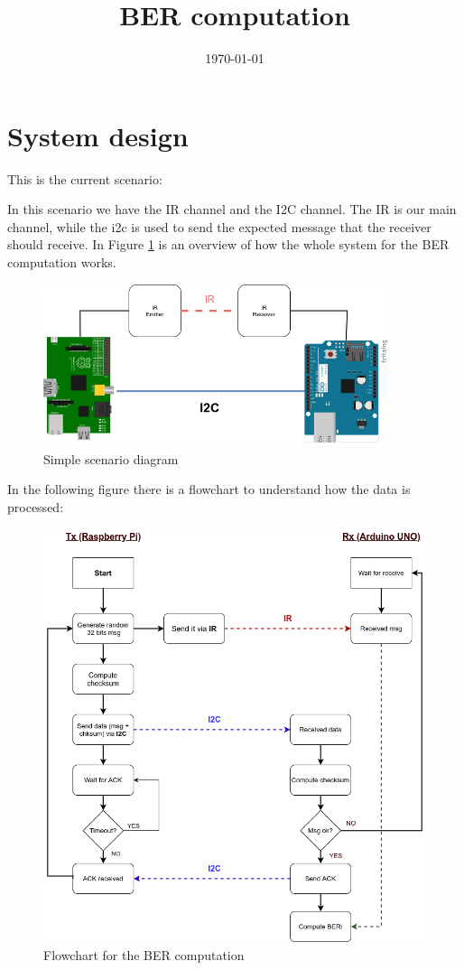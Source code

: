 \documentclass{article}
\title{BER computation}
\date{\today}
\begin{document}
\section{System design}

This is the current scenario:

In this scenario we have the IR channel and the I2C channel. The IR is our
main channel, while the i2c is used to send the expected message
that the receiver should receive. In Figure \ref{fig:07-04-diagram} is an overview of how the whole system
for the BER computation works.

\begin{figure}[H]
	\centering
	\includegraphics[width=0.9\textwidth]{../../img/follow-up-07-04-diagram.png}
	\vspace{-1em}
	\caption{Simple scenario diagram}
	\label{fig:07-04-diagram}
\end{figure}

In the following figure there is a flowchart to understand how the data is processed:

\begin{figure}[H]
	\centering
	\includegraphics[width=1\textwidth]{../../img/BER_flowchart.png}
	\vspace{-1em}
	\caption{Flowchart for the BER computation}
	\label{fig:BER-flowchart}
\end{figure}
\end{document}
